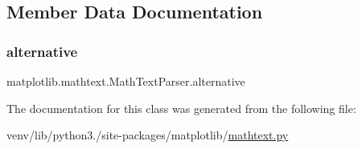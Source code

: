 \subsection{Member Data Documentation}
\mbox{\label{classmatplotlib_1_1mathtext_1_1MathTextParser_a26ef0cd7ccce3713347d9cc9c8a4a8ff}} 
\subsubsection{\texorpdfstring{alternative}{alternative}}
{\footnotesize\ttfamily matplotlib.\+mathtext.\+Math\+Text\+Parser.\+alternative\hspace{0.3cm}{\ttfamily [static]}}



The documentation for this class was generated from the following file\+:\begin{DoxyCompactItemize}
\item 
venv/lib/python3./site-\/packages/matplotlib/\hyperlink{mathtext_8py}{mathtext.\+py}\end{DoxyCompactItemize}
